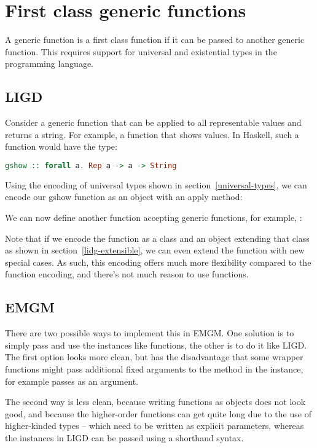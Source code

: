 \section{First class generic functions}

A generic function is a first class function if it can be passed to another
generic function. This requires support for universal and existential types in the programming
language.

\subsection{LIGD}

Consider a generic function that can be applied to all representable values
and returns a string. For example, a function  that shows values.
In Haskell, such a function would have the type:
\begin{lstlisting}[language=Haskell]
gshow :: forall a. Rep a -> a -> String
\end{lstlisting}

Using the encoding of universal types shown in section~\ref{universal-types},
we can encode our gshow function as an object with an apply method:

We can now define another function accepting generic functions, for example, :


Note that if we encode the function as a class and an object extending that
class as shown in section~\ref{lidg-extensible}, we can even extend the
function with new special cases. As such, this encoding offers much more
flexibility compared to the function encoding, and there's not much reason
to use functions.

\subsection{EMGM}
There are two possible ways to implement this in EMGM. One solution is to
simply pass and use the  instances like functions, the other is to do it
like LIGD. The first option looks more clean, but has the disadvantage that
some wrapper functions might pass additional fixed arguments to the method
in the  instance,  for example passes  as
an argument.

The second way is less clean, because writing functions as objects
does not look good, and because the higher-order functions can get quite long due to the
use of higher-kinded types -- which need to be written as explicit parameters,
whereas the  instances in LIGD can be passed using a shorthand syntax.

